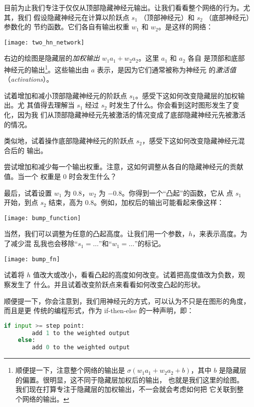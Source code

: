 目前为止我们专注于仅仅从顶部隐藏神经元输出。让我们看看整个网络的行为。尤其，我们
假设隐藏神经元在计算以阶跃点 $s_1$ （顶部神经元）和 $s_2$ （底部神经元）参数化的
节约函数。它们各自有输出权重 $w_1$ 和 $w_2$。是这样的网络：
\begin{center}
  \texttt{[image: two\_hn\_network]}
\end{center}

右边的绘图是隐藏层的\emph{加权输出} $w_1 a_1 + w_2 a_2$。这里 $a_1$ 和 $a_2$ 各自
是顶部和底部神经元的输出\footnote{顺便提一下，注意整个网络的输出是 $\sigma(w_1
  a_1+w_2 a_2 + b)$，其中 $b$ 是隐藏层的偏置。很明显，这不同于隐藏层加权后的输出，
  也就是我们这里的绘图。我们现在打算专注于隐藏层的加权输出，不一会就会考虑如何把
  它关联到整个网络的输出。}。这些输出由 $a$ 表示，是因为它们通常被称为神经元
的\emph{激活值}（\emph{activations}）。

试着增加和减小顶部隐藏神经元的阶跃点 $s_1$。感受下这如何改变隐藏层的加权输出。尤
其值得去理解当 $s_1$ 经过 $s_2$ 时发生了什么。你会看到这时图形发生了变化，因为我
们从顶部隐藏神经元先被激活的情况变成了底部隐藏神经元先被激活的情况。

类似地，试着操作底部隐藏神经元的阶跃点 $s_2$，感受下这如何改变隐藏神经元混合后的
输出。

尝试增加和减少每一个输出权重。注意，这如何调整从各自的隐藏神经元的贡献值。当一个
权重是 0 时会发生什么？

最后，试着设置 $w_1$ 为 $0.8$，$w_2$ 为 $-0.8$。你得到一个“凸起”的函数，它从
点 $s_1$ 开始，到点 $s_2$ 结束，高为 $0.8$。例如，加权后的输出可能看起来像这样：
\begin{center}
  \texttt{[image: bump\_function]}
\end{center}

当然，我们可以调整为任意的凸起高度。让我们用一个参数，$h$，来表示高度。为了减少混
乱我也会移除“$s_1 = \ldots$”和“$w_1 = \ldots$”的标记。
\begin{center}
  \texttt{[image: bump\_fn]}
\end{center}

试着将 $h$ 值改大或改小，看看凸起的高度如何改变。试着把高度值改为负数，观察发生了
什么。并且试着改变阶跃点来看看如何改变凸起的形状。

顺便提一下，你会注意到，我们用神经元的方式，可以认为不只是在图形的角度，而且是更
传统的编程形式，作为 {\serif if-then-else} 的一种声明，即：
\begin{lstlisting}[language=Python]
    if input >= step point:
        add 1 to the weighted output
    else:
        add 0 to the weighted output  
\end{lstlisting}

